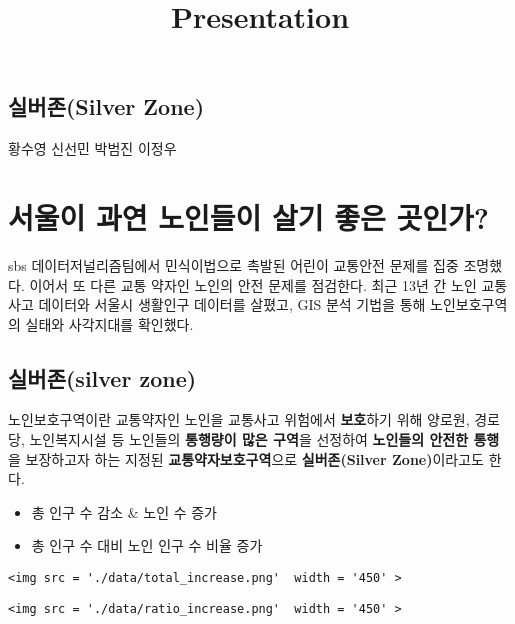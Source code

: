 \documentclass[11pt]{article}
\title{Presentation}
\providecommand{\tightlist}{%
      \setlength{\itemsep}{0pt}\setlength{\parskip}{0pt}}
\begin{document}
    
    
    \maketitle
    
    

    
    \subsection{실버존(Silver Zone)}\label{uxc2e4uxbc84uxc874silver-zone}

황수영 신선민 박범진 이정우

    \section{서울이 과연 노인들이 살기 좋은
곳인가?}\label{uxc11cuxc6b8uxc774-uxacfcuxc5f0-uxb178uxc778uxb4e4uxc774-uxc0b4uxae30-uxc88buxc740-uxacf3uxc778uxac00}

    

    sbs 데이터저널리즘팀에서 민식이법으로 촉발된 어린이 교통안전 문제를 집중
조명했다. 이어서 또 다른 교통 약자인 노인의 안전 문제를 점검한다. 최근
13년 간 노인 교통사고 데이터와 서울시 생활인구 데이터를 살폈고, GIS 분석
기법을 통해 노인보호구역의 실태와 사각지대를 확인했다.

    \subsection{실버존(silver zone)}\label{uxc2e4uxbc84uxc874silver-zone}

노인보호구역이란 교통약자인 노인을 교통사고 위험에서 \textbf{보호}하기
위해 양로원, 경로당, 노인복지시설 등 노인들의 \textbf{통행량이 많은
구역}을 선정하여 \textbf{노인들의 안전한 통행}을 보장하고자 하는 지정된
\textbf{교통약자보호구역}으로 \textbf{실버존(Silver Zone)}이라고도 한다.

    \begin{itemize}
\tightlist
\item
  총 인구 수 감소 \& 노인 수 증가
\item
  총 인구 수 대비 노인 인구 수 비율 증가
\end{itemize}

    \begin{verbatim}
<img src = './data/total_increase.png'  width = '450' > 
\end{verbatim}

\begin{verbatim}
<img src = './data/ratio_increase.png'  width = '450' >
\end{verbatim}
\end{document}
